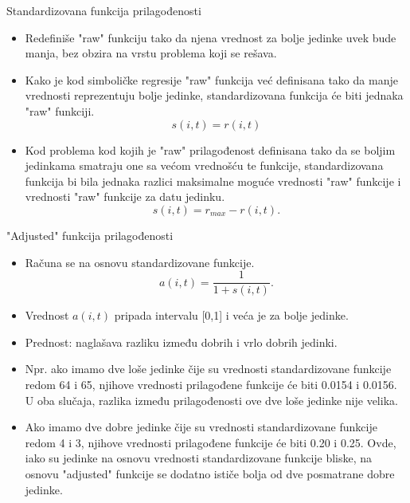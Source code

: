 \documentclass{beamer}
\begin{document}
\begin{frame}{Standardizovana funkcija prilagođenosti}
\begin{itemize}
    \small
    \item Redefiniše "raw" funkciju tako da njena vrednost za bolje jedinke uvek bude manja, bez obzira na vrstu problema koji se rešava.
    \item Kako je kod simboličke regresije "raw" funkcija već definisana tako da manje vrednosti reprezentuju bolje jedinke, standardizovana funkcija će biti jednaka "raw" funkciji.
    \[ s(i,t) = r(i,t) \]
    \item Kod problema kod kojih je "raw" prilagođenost definisana tako da se boljim jedinkama smatraju one sa većom vrednošću te funkcije, standardizovana funkcija bi bila jednaka razlici maksimalne moguće vrednosti "raw" funkcije  i vrednosti "raw" funkcije za datu jedinku.
    \[ s(i,t) = r_{max} - r(i,t). \]
\end{itemize}
\end{frame}

\begin{frame}{"Adjusted" funkcija prilagođenosti}
\begin{itemize}
    \small
    \item Računa se na osnovu standardizovane funkcije.
    \[ a(i,t) = \frac{1}{1 + s(i,t)}. \]
    \item Vrednost $a(i,t)$ pripada intervalu [0,1] i veća je za bolje jedinke.
    \item Prednost: naglašava razliku između dobrih i vrlo dobrih jedinki.
    \item Npr. ako imamo dve loše jedinke čije su vrednosti standardizovane funkcije redom 64 i 65, njihove vrednosti prilagođene funkcije će biti 0.0154 i 0.0156. U oba slučaja, razlika između prilagođenosti ove dve loše jedinke nije velika. 
    \item Ako imamo dve dobre jedinke čije su vrednosti standardizovane funkcije redom 4 i 3, njihove vrednosti prilagođene funkcije će biti 0.20 i 0.25. Ovde, iako su jedinke na osnovu vrednosti standardizovane funkcije bliske, na osnovu "adjusted" funkcije se dodatno ističe bolja od dve posmatrane dobre jedinke.
\end{itemize}
\end{frame}
\end{document}
